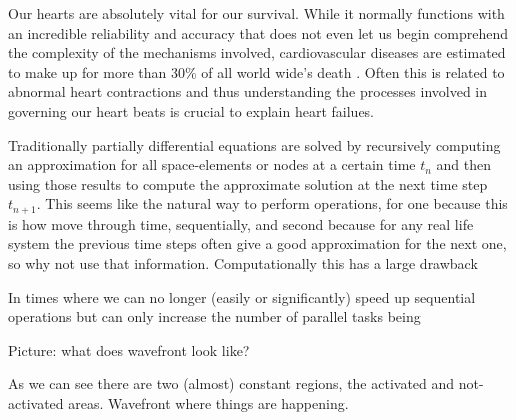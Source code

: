 \documentclass[../draft_1.tex]{subfiles}
\begin{document}
Our hearts are absolutely vital for our survival. While it normally functions with an incredible reliability and accuracy that does not even let us begin comprehend the complexity of the mechanisms involved, cardiovascular diseases are estimated to make up for more than 30\% of all world wide's death \cite{WHO_statistics}. Often this is related to abnormal heart contractions and thus understanding the processes involved in governing our heart beats is crucial to explain heart failues.  


Traditionally partially differential equations are solved by recursively computing an approximation for all space-elements or nodes at a certain time $t_n$ and then using those results to compute the approximate solution at the next time step $t_{n+1}$. This seems like the natural way to perform operations, for one because this is how move through time, sequentially, and second because for any real life system the previous time steps often give a good approximation for the next one, so why not use that information. Computationally this has a large drawback 

In times where we can no longer (easily or significantly) speed up sequential operations but can only increase the number of parallel tasks being 

Picture: what does wavefront look like? 

As we can see there are two (almost) constant regions, the activated and not-activated areas. 
Wavefront where things are happening. 
\end{document}
